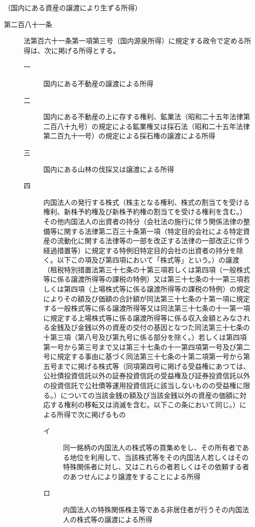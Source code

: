 \documentclass[twocolumn,a4j,10pt]{ltjtarticle}
\begin{document}
\noindent\hspace{10pt}（国内にある資産の譲渡により生ずる所得）
\begin{description}
\item[第二百八十一条]法第百六十一条第一項第三号（国内源泉所得）に規定する政令で定める所得は、次に掲げる所得とする。
\begin{description}
\item[一]国内にある不動産の譲渡による所得
\item[二]国内にある不動産の上に存する権利、鉱業法（昭和二十五年法律第二百八十九号）の規定による鉱業権又は採石法（昭和二十五年法律第二百九十一号）の規定による採石権の譲渡による所得
\item[三]国内にある山林の伐採又は譲渡による所得
\item[四]内国法人の発行する株式（株主となる権利、株式の割当てを受ける権利、新株予約権及び新株予約権の割当てを受ける権利を含む。）その他内国法人の出資者の持分（会社法の施行に伴う関係法律の整備等に関する法律第二百三十条第一項（特定目的会社による特定資産の流動化に関する法律等の一部を改正する法律の一部改正に伴う経過措置等）に規定する特例旧特定目的会社の出資者の持分を除く。以下この項及び第四項において「株式等」という。）の譲渡（租税特別措置法第三十七条の十第三項若しくは第四項（一般株式等に係る譲渡所得等の課税の特例）又は第三十七条の十一第三項若しくは第四項（上場株式等に係る譲渡所得等の課税の特例）の規定によりその額及び価額の合計額が同法第三十七条の十第一項に規定する一般株式等に係る譲渡所得等又は同法第三十七条の十一第一項に規定する上場株式等に係る譲渡所得等に係る収入金額とみなされる金銭及び金銭以外の資産の交付の基因となつた同法第三十七条の十第三項（第八号及び第九号に係る部分を除く。）若しくは第四項第一号から第三号まで又は第三十七条の十一第四項第一号及び第二号に規定する事由に基づく同法第三十七条の十第二項第一号から第五号までに掲げる株式等（同項第四号に掲げる受益権にあつては、公社債投資信託以外の証券投資信託の受益権及び証券投資信託以外の投資信託で公社債等運用投資信託に該当しないものの受益権に限る。）についての当該金銭の額及び当該金銭以外の資産の価額に対応する権利の移転又は消滅を含む。以下この条において同じ。）による所得で次に掲げるもの
\begin{description}
\item[イ]同一銘柄の内国法人の株式等の買集めをし、その所有者である地位を利用して、当該株式等をその内国法人若しくはその特殊関係者に対し、又はこれらの者若しくはその依頼する者のあつせんにより譲渡をすることによる所得
\item[ロ]内国法人の特殊関係株主等である非居住者が行うその内国法人の株式等の譲渡による所得

\end{description}
\end{description}
\end{description}
\end{document}
